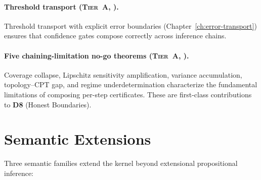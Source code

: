 \paragraph{Threshold transport (\textsc{Tier~A}, \claimConditional{}).}
Threshold transport with explicit error boundaries
(Chapter~\ref{ch:error-transport}) ensures that confidence gates
compose correctly across inference chains.

\paragraph{Five chaining-limitation no-go theorems
  (\textsc{Tier~A}, \claimBoundary{}).}
Coverage collapse, Lipschitz sensitivity amplification, variance
accumulation, topology--CPT gap, and regime underdetermination
characterize the fundamental limitations of composing per-step
certificates.  These are first-class contributions to \textbf{D8}
(Honest Boundaries).



\section{Semantic Extensions}
\label{sec:covers-extensions}

Three semantic families extend the kernel beyond extensional
propositional inference:

